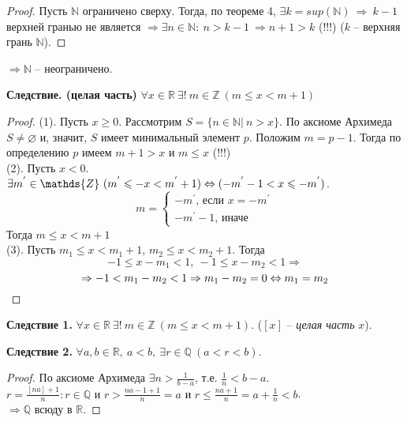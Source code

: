     \begin{proof}
        Пусть $\mathds{N}$ ограничено сверху. Тогда, по теореме 4, $\exists k = sup(\mathds{N}) \ \Rightarrow \ k-1$ верхней гранью не является $\Rightarrow \exists n \in \mathds{N}: \ n > k - 1 \ \Rightarrow n + 1 > k$ (!!!) ($k$ -- верхняя грань $\mathds{N}$).
    \end{proof}
    $\Rightarrow \mathds{N}$ -- неограничено. 
    
    \textbf{Следствие. (целая часть)} $\forall x \in \mathds{R} \  \exists ! \ m \in \mathds{Z} \ (m \leq x < m + 1)$
    
    \begin{proof}
        (1). Пусть $x \geq 0$. Рассмотрим $S = \{n \in \mathds{N}| \ n > x\}$. По аксиоме Архимеда $S \neq \varnothing$ и, значит, $S$ имеет минимальный элемент $p$. Положим $m = p - 1$. Тогда по определению $p$ имеем  $m + 1 > x$ и $m \leq x$ (!!!)
        \\
        (2). Пусть $x < 0$. $\exists m^{'} \in \mathds{Z} \ (m^{'} \leq -x < m^{'} + 1) \lra (-m^{'} - 1 < x \leq -m^{'})$. \[m =
        \begin{cases}
            -m^{'} \text{, если }x = -m^{'}
            \\
            -m^{'} - 1 \text{, иначе}
        \end{cases}\]
        Тогда $m \leq x < m + 1$
        \\
        (3). Пусть $m_{1} \leq x < m_{1} + 1$, $m_{2} \leq x < m_{2} + 1$. Тогда 
        \[-1 \leq x - m_{1} < 1, \ -1 \leq x - m_{2} < 1 \Rightarrow\]
        \[\Rightarrow -1 < m_{1} - m_{2} < 1 \Rightarrow m_{1} - m_{2} = 0 \Leftrightarrow m_{1} = m_{2}\]
    \end{proof}
    
    \textbf{Следствие 1.} $\forall x \in \mathds{R} \  \exists ! \ m \in \mathds{Z} \ (m \leq x < m + 1)$. ($[x]$ -- \textit{целая часть} $x$).
    
    \textbf{Следствие 2.} $\forall a, b \in \mathds{R}, \  a < b, \ \exists r \in \mathds{Q} \ (a < r < b)$.
    
    \begin{proof}
        По аксиоме Архимеда $\exists n > \frac{1}{b - a}$, т.е. $\frac{1}{n} < b - a$.
        \\
        $r = \frac{[na] + 1}{n}: r \in \mathds{Q} \text{ и } r > \frac{na - 1 + 1}{n} = a \text{ и } r \leq \frac{na + 1}{n} = a + \frac{1}{n} < b$.
        \\
        $\Rightarrow \mathds{Q}$ всюду в $\mathds{R}$.
    \end{proof}
    
